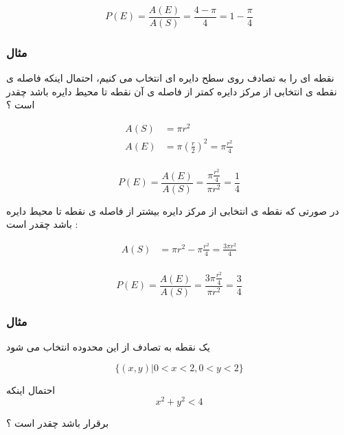 \documentclass[12pt]{book}
\begin{document}
$$
P(E) = \frac{A(E)}{A(S)} = \frac{4-\pi}{4} = 1 - \frac{\pi}{4}
$$


\subsubsection{مثال}
نقطه ای را به تصادف روی سطح دایره ای انتخاب می کنیم، احتمال اینکه فاصله ی نقطه ی انتخابی از مرکز دایره کمتر از فاصله ی آن نقطه تا محیط دایره باشد چقدر است ؟


\begin{align*}
A(S) &= \pi r^{2} \\
A(E) &= \pi (\frac{r}{2})^{2} = \pi \frac{r^{2}}{4} \\
\end{align*}


$$
P(E) = \frac{A(E)}{A(S)} = \frac{\pi \frac{r^{2}}{4}}{\pi r^{2}} = \frac{1}{4}
$$


در صورتی که نقطه ی انتخابی از مرکز دایره بیشتر از فاصله ی نقطه تا محیط دایره باشد چقدر است :

\begin{align*}
A(S) &= \pi r^{2} - \pi \frac{r^{2}}{4} = \frac{3 \pi r^{2}}{4} \\
\end{align*}

$$
P(E) = \frac{A(E)}{A(S)} = \frac{3 \pi \frac{r^{2}}{4}}{\pi r^{2}} = \frac{3}{4}
$$


\subsubsection{مثال}
یک نقطه به تصادف از این محدوده انتخاب می شود

$$
\{ (x, y) | 0 < x < 2 , 0 < y < 2 \}
$$

احتمال اینکه 
$$
x^{2} + y^{2} < 4
$$

برقرار باشد چقدر است ؟

\end{document}
